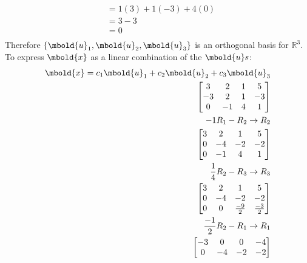 \documentclass[12pt letter]{report}
\begin{document}
{\begin{align*}
                                  & = 1(3) + 1(-3) + 4(0)                                                                         \\
                                  & = 3 - 3                                                                                       \\
                                  & = 0                                                                                           \\
  \end{align*}
  Therefore $\{\mbold{u}_1, \mbold{u}_2, \mbold{u}_3\} $ is an orthogonal basis for $\mathbb{R}^{3}$. To express
  $\mbold{x}$ as a linear combination of the $\mbold{u}s$:
  \begin{align*}
    \mbold{x} = c_1 \mbold{u}_1 + c_2 \mbold{u}_2 + c_3 \mbold{u}_3 \\
    \begin{bmatrix}
      3  & 2  & 1 & 5  \\
      -3 & 2  & 1 & -3 \\
      0  & -1 & 4 & 1
    \end{bmatrix}                                                \\
    -1R_1 - R_2  \rightarrow R_2                                    \\
    \begin{bmatrix}
      3 & 2  & 1  & 5  \\
      0 & -4 & -2 & -2 \\
      0 & -1 & 4  & 1  \\
    \end{bmatrix}
    \\
    \frac{1}{4}R_2 - R_3  \rightarrow R_3                           \\
    \begin{bmatrix}
      3 & 2  & 1            & 5            \\
      0 & -4 & -2           & -2           \\
      0 & 0  & \frac{-9}{2} & \frac{-3}{2} \\
    \end{bmatrix}
    \\
    \frac{-1}{2}R_2 - R_1  \rightarrow R_1                          \\
    \begin{bmatrix}
      -3 & 0  & 0            & -4           \\
      0  & -4 & -2           & -2           \\

\end{bmatrix}
\end{align*}}
\end{document}
